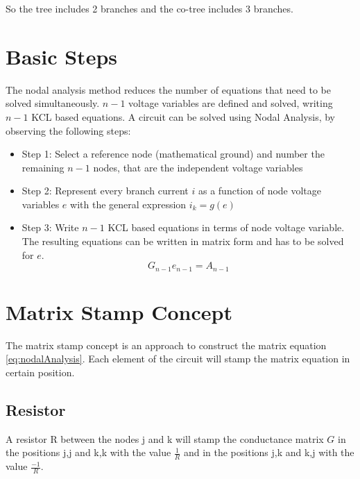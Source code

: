 So the tree includes 2 branches and the co-tree includes 3 branches.

\section{Basic Steps}
The nodal analysis method reduces the number of equations that need to be solved simultaneously. $n-1$ voltage variables are defined and solved, writing $n-1$ KCL based equations. 
A circuit can be solved using Nodal Analysis, by observing the following steps:

\begin{itemize}
\item Step 1: Select a reference node (mathematical ground) and number the remaining $n-1$ nodes, that are the independent voltage variables
\item Step 2: Represent every branch current $i$ as a function of node voltage variables $e$ with the general expression $i_k = g(e)$
\item Step 3: Write $n-1$ KCL based equations in terms of node voltage variable. The resulting equations can be written in matrix form and has to be solved for $e$.
\begin{equation} \label{eq:nodalAnalysis}
G_{n-1}e_{n-1} =  A_{n-1}
\end{equation}
\end{itemize}

\section{Matrix Stamp Concept}
The matrix stamp concept is an approach to construct the matrix equation \ref{eq:nodalAnalysis}. Each element of the circuit will stamp the matrix equation in certain position.

\subsection{Resistor} \label{ResistorMatrixStamp}
A resistor R between the nodes j and k will stamp the conductance matrix $G$ in the positions j,j and k,k with the value $\frac{1}{R} $ and in the positions j,k and k,j with the value $\frac{-1}{R} $.

